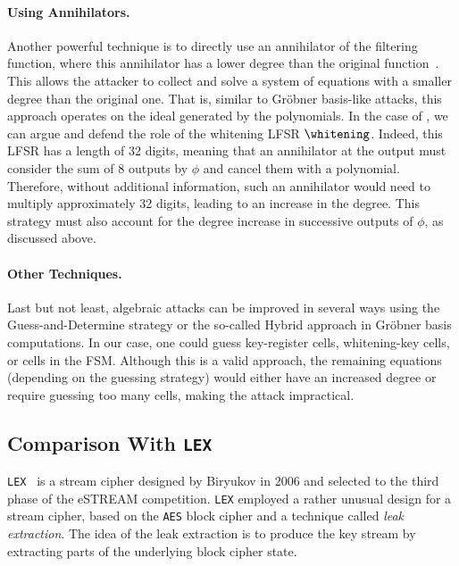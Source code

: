 \paragraph{Using Annihilators.} Another powerful technique is to directly use an annihilator of the filtering function, where this annihilator has a lower degree than the original function~\cite{EC:CouMei03,C:Courtois03}. This allows the attacker to collect and solve a system of equations with a smaller degree than the original one. That is, similar to Gröbner basis-like attacks, this approach operates on the ideal generated by the polynomials. In the case of \coolName{}, we can argue and defend the role of the whitening LFSR \( \whitening \). Indeed, this LFSR has a length of 32 digits, meaning that an annihilator at the output must consider the sum of 8 outputs by \( \phi \) and cancel them with a polynomial. Therefore, without additional information, such an annihilator would need to multiply approximately 32 digits, leading to an increase in the degree. This strategy must also account for the degree increase in successive outputs of \( \phi \), as discussed above.

\paragraph{Other Techniques.}
Last but not least, algebraic attacks can be improved in several ways using the Guess-and-Determine strategy or the so-called Hybrid approach in Gröbner basis computations. In our case, one could guess key-register cells, whitening-key cells, or cells in the FSM. Although this is a valid approach, the remaining equations (depending on the guessing strategy) would either have an increased degree or require guessing too many cells, making the attack impractical.



\subsection{Comparison With {\tt LEX}}
\label{sec:security-lex}

{\tt LEX}~\cite{SAC:Biryukov06} is a stream cipher designed by Biryukov in 2006 and selected to the third phase of the eSTREAM competition. {\tt LEX} employed a rather unusual design for a stream cipher, based on the {\tt AES} block cipher and a technique called \emph{leak extraction}. The idea of the leak extraction is to produce the key stream by extracting parts of the underlying block cipher state.

